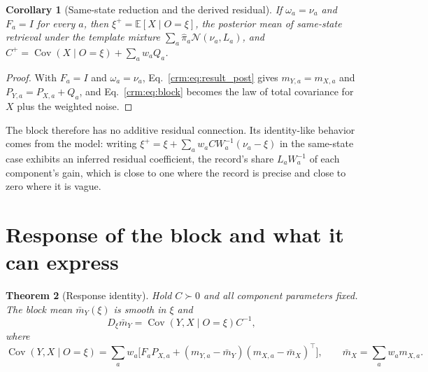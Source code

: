 \documentclass[11pt]{article}
\newtheorem{theorem}{Theorem}[section]
\newtheorem{corollary}[theorem]{Corollary}
\theoremstyle{definition}
\theoremstyle{remark}
\newcommand{\E}{\mathbb E}
\newcommand{\Gauss}{\mathcal N}
\newcommand{\Cov}{\operatorname{Cov}}
\newcommand{\pihat}{\hat\pi}
\begin{document}
\begin{corollary}[Same-state reduction and the derived residual]
\label{crm:cor:reduction}
If $\omega_a=\nu_a$ and $F_a=I$ for every $a$, then $\xi^+=\E[X\mid O=\xi]$, the posterior mean of same-state retrieval under the template mixture $\sum_a\pihat_a\Gauss(\nu_a,L_a)$, and $C^+=\Cov(X\mid O=\xi)+\sum_aw_aQ_a$.
\end{corollary}

\begin{proof}
With $F_a=I$ and $\omega_a=\nu_a$, Eq.~\eqref{crm:eq:result_post} gives $m_{Y,a}=m_{X,a}$ and $P_{Y,a}=P_{X,a}+Q_a$, and Eq.~\eqref{crm:eq:block} becomes the law of total covariance for $X$ plus the weighted noise.
\end{proof}

The block therefore has no additive residual connection. Its identity-like behavior comes from the model: writing $\xi^+=\xi+\sum_aw_aC W_a^{-1}(\nu_a-\xi)$ in the same-state case exhibits an inferred residual coefficient, the record's share $L_aW_a^{-1}$ of each component's gain, which is close to one where the record is precise and close to zero where it is vague.

\section{Response of the block and what it can express}
\label{crm:sec:response}

\begin{theorem}[Response identity]
\label{crm:thm:response}
Hold $C\succ0$ and all component parameters fixed. The block mean $\bar m_Y(\xi)$ is smooth in $\xi$ and
\begin{equation}
D_\xi\bar m_Y=\Cov(Y,X\mid O=\xi)C^{-1},
\label{crm:eq:response}
\end{equation}
where
\begin{equation}
\Cov(Y,X\mid O=\xi)=\sum_aw_a\bigl[F_aP_{X,a}+(m_{Y,a}-\bar m_Y)(m_{X,a}-\bar m_X)^\top\bigr],\qquad \bar m_X=\sum_aw_am_{X,a}.
\label{crm:eq:cross_cov}
\end{equation}
\end{theorem}
\end{document}
